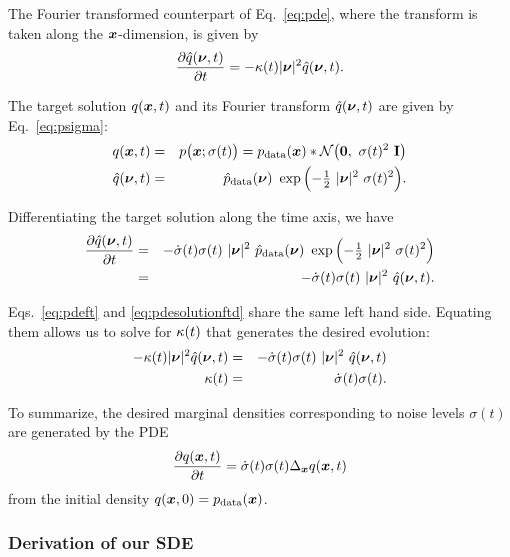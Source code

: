 The Fourier transformed counterpart of Eq.~\ref{eq:pde}, where the transform is taken along the $\boldsymbol{x}$-dimension, is given by
\begin{equation}
  \frac{\partial \hat {q}(\boldsymbol{\nu}, t)}{\partial t} = - \kappa(t) |\boldsymbol{\nu}|^2 \hat {q}(\boldsymbol{\nu}, t)
  \label{eq:pdeft}
  \text{.}
\end{equation}

The target solution $q(\boldsymbol{x}, t)$ and its Fourier transform $\hat {q}(\boldsymbol{\nu}, t)$ are given by Eq.~\ref{eq:psigma}:
\begin{eqnarray}
  q(\boldsymbol{x}, t) &=& p\big( \boldsymbol{x}; \sigma(t) \big) = p_\text{data}(\boldsymbol{x}) \ast \mathcal{N}\big( \mathbf{0}, ~\sigma(t)^2 ~\mathbf{I} \big) \\
  \hat {q}(\boldsymbol{\nu}, t) &=& \hat{p}_\text{data}(\boldsymbol{\nu}) ~\exp\Big( {-}\tfrac{1}{2} ~|\boldsymbol{\nu}|^2 ~\sigma(t)^2 \Big)
  \text{.}
\end{eqnarray}

Differentiating the target solution along the time axis, we have
\begin{eqnarray}
  \frac{\partial \hat {q}(\boldsymbol{\nu}, t)}{\partial t} &=& - \dot\sigma(t) \sigma(t) ~|\boldsymbol{\nu}|^2 ~ \hat{p}_\text{data}(\boldsymbol{\nu}) ~\exp\Big( {-}\tfrac{1}{2} ~|\boldsymbol{\nu}|^2 ~\sigma(t)^2 \Big) \\
  &=& - \dot \sigma(t) \sigma(t) ~|\boldsymbol{\nu}|^2 ~\hat{q}(\boldsymbol{\nu},t)
  \label{eq:pdesolutionftd}
  \text{.}
\end{eqnarray}

Eqs.~\ref{eq:pdeft} and \ref{eq:pdesolutionftd} share the same left hand side. Equating them allows us to solve for $\kappa(t)$ that generates the desired evolution:
\begin{eqnarray}
  - \kappa(t) |\boldsymbol{\nu}|^2 \hat {q}(\boldsymbol{\nu}, t) &=& - \dot \sigma(t) \sigma(t) ~ |\boldsymbol{\nu}|^2 ~ \hat {q}(\boldsymbol{\nu},t) \\
  \kappa(t) &=& \dot \sigma(t) \sigma(t)
  \text{.}
\end{eqnarray}

To summarize, the desired marginal densities corresponding to noise levels $\sigma(t)$ are generated by the PDE
\begin{equation}
  \frac{\partial q(\boldsymbol{x}, t)}{\partial t} = \dot \sigma(t) \sigma(t) {\Delta_{\boldsymbol{x}}} q(\boldsymbol{x}, t)
  \label{eq:marginalpde}
\end{equation}
from the initial density $q(\boldsymbol{x}, 0) = p_\text{data}(\boldsymbol{x})$.

\subsubsection{Derivation of our SDE}


